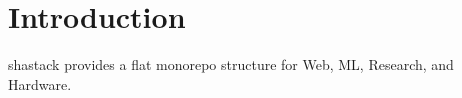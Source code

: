 \section{Introduction}
shastack provides a flat monorepo structure for Web, ML, Research, and Hardware.
